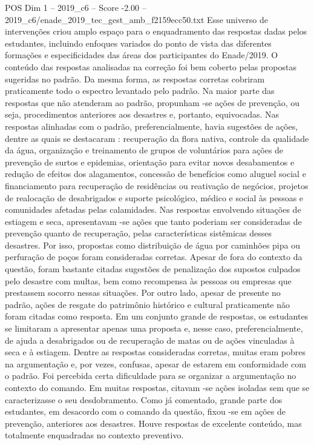 \begin{textsample}{POS Dim 1 – 2019\_c6 – Score -2.00 – 2019\_c6/enade\_2019\_tec\_gest\_amb\_f2159ecc50.txt}
Esse universo de intervenções criou amplo espaço para o enquadramento das respostas dadas pelos estudantes, incluindo enfoques variados do ponto de vista das diferentes formações e especificidades das áreas dos participantes do Enade/2019.
O conteúdo das respostas analisadas na correção foi bem coberto pelas propostas sugeridas no padrão.
Da mesma forma, as respostas corretas cobriram praticamente todo o espectro levantado pelo padrão.
Na maior parte das respostas que não atenderam ao padrão, propunham -se ações de prevenção, ou seja, procedimentos anteriores aos desastres e, portanto, equivocadas.
Nas respostas alinhadas com o padrão, preferencialmente, havia sugestões de ações, dentre as quais se destacaram : recuperação da flora nativa, controle da qualidade da água, organização e treinamento de grupos de voluntários para ações de prevenção de surtos e epidemias, orientação para evitar novos desabamentos e redução de efeitos dos alagamentos, concessão de benefícios como aluguel social e financiamento para recuperação de residências ou reativação de negócios, projetos de realocação de desabrigados e suporte psicológico, médico e social às pessoas e comunidades afetadas pelas calamidades.
Nas respostas envolvendo situações de estiagem e seca, apresentavam -se ações que tanto poderiam ser consideradas de prevenção quanto de recuperação, pelas características sistêmicas desses desastres.
Por isso, propostas como distribuição de água por caminhões pipa ou perfuração de poços foram consideradas corretas.
Apesar de fora do contexto da questão, foram bastante citadas sugestões de penalização dos supostos culpados pelo desastre com multas, bem como recompensa às pessoas ou empresas que prestassem socorro nessas situações.
Por outro lado, apesar de presente no padrão, ações de resgate do patrimônio histórico e cultural praticamente não foram citadas como resposta.
Em um conjunto grande de respostas, os estudantes se limitaram a apresentar apenas uma proposta e, nesse caso, preferencialmente, de ajuda a desabrigados ou de recuperação de matas ou de ações vinculadas à seca e à estiagem.
Dentre as respostas consideradas corretas, muitas eram pobres na argumentação e, por vezes, confusas, apesar de estarem em conformidade com o padrão.
Foi percebida certa dificuldade para se organizar a argumentação no contexto do comando.
Em muitas respostas, citavam -se ações isoladas sem que se caracterizasse o seu desdobramento.
Como já comentado, grande parte dos estudantes, em desacordo com o comando da questão, fixou -se em ações de prevenção, anteriores aos desastres.
Houve respostas de excelente conteúdo, mas totalmente enquadradas no contexto preventivo.

\end{textsample}
